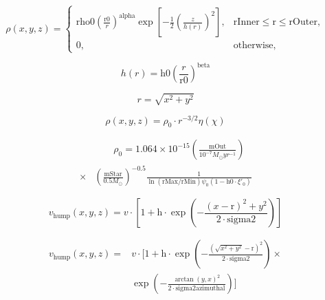 \documentclass[a4paper,14pt]{extarticle}
\begin{document}
\begin{equation*}
\rho(\mathit{x},\mathit{y},\mathit{z}) = \begin{cases}
               \mathrm{rho0} \left(\frac{\mathrm{r0}}{r}\right)^\mathrm{alpha} \exp\left[-\frac{1}{2}\left(\frac{ \mathit{z}}{h(r)}\right)^2\right],       &  \mathrm{rInner} \le \mathrm{r} \le  \mathrm{rOuter}, \\
               0,& \text{otherwise},          \end{cases}
\end{equation*}

\begin{equation*}
 h(r)=\mathrm{h0}\left(\frac{r}{\mathrm{r0}}\right)^\mathrm{beta}
\end{equation*}

\begin{equation*}
 r=\sqrt{\mathit{x}^2+\mathit{y}^2}
\end{equation*}


\begin{equation*}
 \rho(\mathit{x},\mathit{y},\mathit{z}) = \rho_0 \cdot r^{-3/2}\eta(\chi)
\end{equation*}

\begin{equation*}\begin{split}
  &\qquad \rho_0= 1.064 \times 10^{-15}\left( \frac{\mathrm{mOut}}{10^{-7}M_\odot yr^{-1}}\right)\\
 \times&\left(  \frac{\mathrm{mStar}}{0.5M_\odot}\right)^{-0.5} \frac{1}{\ln (\mathrm{rMax}/\mathrm{rMin}) \psi_0 (1 - \mathrm{h0}\cdot\xi'_0)}
\end{split}\end{equation*}


\begin{equation*}
v_{\mathrm{hump}}(\mathit{x},\mathit{y},\mathit{z}) = 
v \cdot \left[1 + \mathrm{h} \cdot \exp\left(
        -\frac{(\mathit{x}-\mathrm{r})^2 + \mathit{y}^2}
        {2 \cdot \mathrm{sigma2}} 
        \right) \right]
\end{equation*}

\begin{equation*}\begin{aligned}
     v_{\mathrm{hump}}(\mathit{x},\mathit{y},\mathit{z}) = &
     v \cdot\Biggl[1 + \mathrm{h} \cdot \exp\left(
        -\frac{(\sqrt{\mathit{x}^2 + \mathit{y}^2}-\mathrm{r})^2}{2 \cdot \mathrm{sigma2}} \right) \times  \\ 
      &  \exp\left(
        -\frac{\arctan(y, x)^2}{2 \cdot \mathrm{sigma2azimuthal}} \right)\Biggr]             
\end{aligned}\end{equation*}
\end{document}
